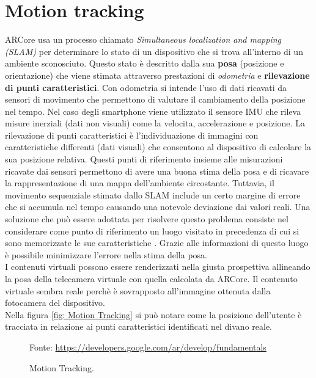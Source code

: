 \documentclass[crop=false, class=book]{standalone}
\begin{document}
	\section{Motion tracking}
	\label{sec:motion_tracking}
	
		ARCore usa un processo chiamato \emph{Simultaneous localization and mapping (SLAM)} per determinare lo stato di un
		dispositivo che si trova all'interno di un ambiente sconosciuto. Questo stato è descritto dalla sua \textbf{posa} (posizione e orientazione) che viene stimata attraverso prestazioni di \emph{odometria} e \textbf{rilevazione di punti caratteristici}. Con odometria si intende l'uso di dati ricavati da sensori di movimento che permettono di valutare il cambiamento della posizione nel tempo. Nel caso degli smartphone viene utilizzato il sensore IMU che rileva misure inerziali (dati non visuali) come la velocita, accelerazione e posizione. La rilevazione di punti caratteristici è l'individuazione di immagini con caratteristiche differenti (dati visuali) che	consentono al dispositivo di calcolare la sua posizione relativa. Questi punti di riferimento insieme alle misurazioni ricavate dai sensori permettono di avere una buona stima della posa e di ricavare la rappresentazione di una mappa dell'ambiente circostante. Tuttavia, il movimento sequenziale stimato dallo SLAM include un certo margine di errore che si accumula nel tempo causando una notevole deviazione dai valori reali. Una soluzione che può essere adottata per risolvere questo problema consiste nel considerare come punto di riferimento un luogo visitato in precedenza di cui si sono memorizzate le sue caratteristiche \cite{mathworks2022slam}. Grazie alle informazioni di questo luogo è possibile minimizzare l'errore nella stima della posa.\\
		I contenuti virtuali possono essere renderizzati nella giusta prospettiva allineando la posa della telecamera virtuale con quella calcolata da ARCore. Il contenuto virtuale sembra reale perchè è sovrapposto all'immagine ottenuta dalla fotocamera del dispositivo.\\
		Nella figura \vref{fig: Motion Tracking} si può notare come la posizione dell'utente è tracciata in relazione ai punti caratteristici identificati nel divano reale.
		
		\begin{figure}[h]
			\centering
			{Fonte: \url{https://developers.google.com/ar/develop/fundamentals}}
			\caption{Motion Tracking.}
			\label{fig: Motion Tracking}
		\end{figure}
		
\end{document}

